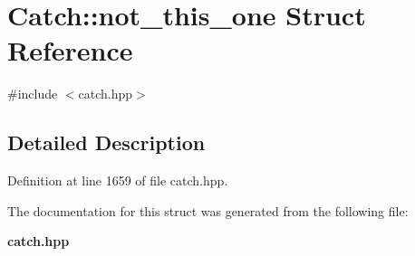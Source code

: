 \section{Catch\+::not\+\_\+this\+\_\+one Struct Reference}
\label{struct_catch_1_1not__this__one}


{\ttfamily \#include $<$catch.\+hpp$>$}



\subsection{Detailed Description}


Definition at line 1659 of file catch.\+hpp.



The documentation for this struct was generated from the following file\+:\begin{DoxyCompactItemize}
\item 
\textbf{ catch.\+hpp}\end{DoxyCompactItemize}
